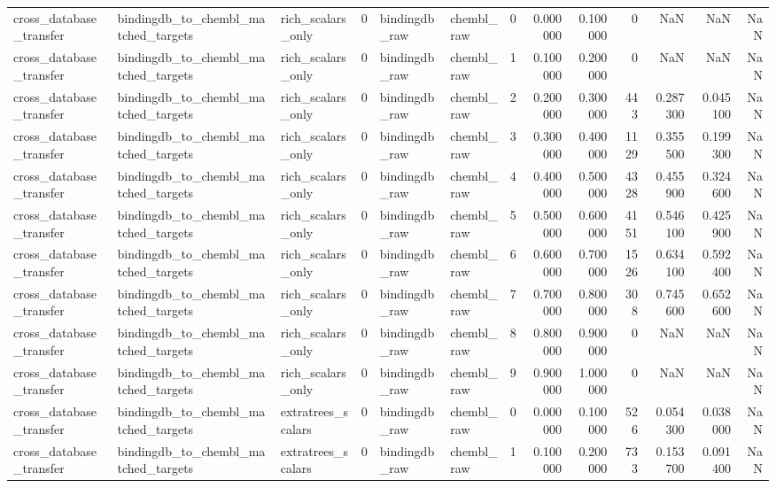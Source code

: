 \begin{longtable}{lllrllrrrrrrr}
cross\_database\_transfer & bindingdb\_to\_chembl\_matched\_targets & rich\_scalars\_only & 0 & bindingdb\_raw & chembl\_raw & 0 & 0.000000 & 0.100000 & 0 & NaN & NaN & NaN \\
cross\_database\_transfer & bindingdb\_to\_chembl\_matched\_targets & rich\_scalars\_only & 0 & bindingdb\_raw & chembl\_raw & 1 & 0.100000 & 0.200000 & 0 & NaN & NaN & NaN \\
cross\_database\_transfer & bindingdb\_to\_chembl\_matched\_targets & rich\_scalars\_only & 0 & bindingdb\_raw & chembl\_raw & 2 & 0.200000 & 0.300000 & 443 & 0.287300 & 0.045100 & NaN \\
cross\_database\_transfer & bindingdb\_to\_chembl\_matched\_targets & rich\_scalars\_only & 0 & bindingdb\_raw & chembl\_raw & 3 & 0.300000 & 0.400000 & 1129 & 0.355500 & 0.199300 & NaN \\
cross\_database\_transfer & bindingdb\_to\_chembl\_matched\_targets & rich\_scalars\_only & 0 & bindingdb\_raw & chembl\_raw & 4 & 0.400000 & 0.500000 & 4328 & 0.455900 & 0.324600 & NaN \\
cross\_database\_transfer & bindingdb\_to\_chembl\_matched\_targets & rich\_scalars\_only & 0 & bindingdb\_raw & chembl\_raw & 5 & 0.500000 & 0.600000 & 4151 & 0.546100 & 0.425900 & NaN \\
cross\_database\_transfer & bindingdb\_to\_chembl\_matched\_targets & rich\_scalars\_only & 0 & bindingdb\_raw & chembl\_raw & 6 & 0.600000 & 0.700000 & 1526 & 0.634100 & 0.592400 & NaN \\
cross\_database\_transfer & bindingdb\_to\_chembl\_matched\_targets & rich\_scalars\_only & 0 & bindingdb\_raw & chembl\_raw & 7 & 0.700000 & 0.800000 & 308 & 0.745600 & 0.652600 & NaN \\
cross\_database\_transfer & bindingdb\_to\_chembl\_matched\_targets & rich\_scalars\_only & 0 & bindingdb\_raw & chembl\_raw & 8 & 0.800000 & 0.900000 & 0 & NaN & NaN & NaN \\
cross\_database\_transfer & bindingdb\_to\_chembl\_matched\_targets & rich\_scalars\_only & 0 & bindingdb\_raw & chembl\_raw & 9 & 0.900000 & 1.000000 & 0 & NaN & NaN & NaN \\
cross\_database\_transfer & bindingdb\_to\_chembl\_matched\_targets & extratrees\_scalars & 0 & bindingdb\_raw & chembl\_raw & 0 & 0.000000 & 0.100000 & 526 & 0.054300 & 0.038000 & NaN \\
cross\_database\_transfer & bindingdb\_to\_chembl\_matched\_targets & extratrees\_scalars & 0 & bindingdb\_raw & chembl\_raw & 1 & 0.100000 & 0.200000 & 733 & 0.153700 & 0.091400 & NaN \\

\end{longtable}

